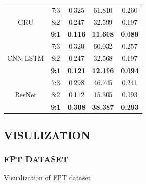 \documentclass[conference]{IEEEtran}
\begin{document}
\begin{table}[H]
\begin{tabular}{|c|c|c|c|c|}
         \hline
         \multirow{3}{*}{GRU} & 7:3 & 0.325 & 61.810 & 0.260 \\ 
         & 8:2 & 0.247 & 32.599 & 0.197 \\ 
         & \textbf{9:1} & \textbf{0.116} & \textbf{11.608} & \textbf{0.089} \\
         \hline
         \multirow{3}{*}{CNN-LSTM} & 7:3 & 0.320 & 60.032 & 0.257 \\ 
         & 8:2 & 0.247 & 32.568 & 0.197 \\ 
         & \textbf{9:1} & \textbf{0.121} & \textbf{12.196} & \textbf{0.094} \\
         \hline
         \multirow{3}{*}{ResNet} & 7:3 & 0.298 & 46.745 & 0.241 \\ 
         & 8:2 & 0.112 & 15.305 & 0.093 \\ 
         & \textbf{9:1} & \textbf{0.308} & \textbf{38.387} & \textbf{0.293} \\
         \hline
    \end{tabular}
    \label{ELCresult}
\end{table}

\subsection{VISULIZATION}
\subsubsection{FPT DATASET}  {Visualization of FPT dataset}
\end{document}
